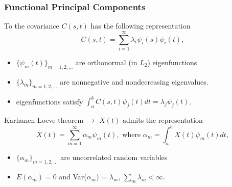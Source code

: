 

\begin{frame}
\frametitle{Functional Principal Components}
To the covariance $C(s,t)$ has the following representation 
\begin{equation*} 
 C(s,t) = \sum_{i=1}^{\infty}\lambda_i\psi_i(s)\psi_i(t),
\end{equation*}
\begin{itemize}
\item  $\{\psi_m(t)\}_{m=1,2,\ldots}$ are orthonormal (in $L_2$) eigenfunctions
\item  $\{\lambda_m \}_{m=1,2,\ldots}$ are nonnegative and nondecreasing eigenvalues. 
\item eigenfunctions satisfy $\int_a^bC(s,t)\psi_j(t)dt = \lambda_j\psi_j(t)$. 
\end{itemize}
Karhunen-Loeve theorem $\rightarrow$ $X(t)$ admits the representation
\begin{equation*}
X(t) =  \sum_{m=1}^{\infty}\alpha_m \psi_m(t), \mbox{ where  } \alpha_m = \int_a^b X(t) \psi_m(t)dt,
\end{equation*}
\begin{itemize}
\item $\{\alpha_m \}_{m=1,2,\ldots}$ are uncorrelated random variables
\item $E(\alpha_m)=0$ and Var($\alpha_m$) = $\lambda_m$, $\sum_m \lambda_m < \infty$. 
\end{itemize}
\end{frame}

